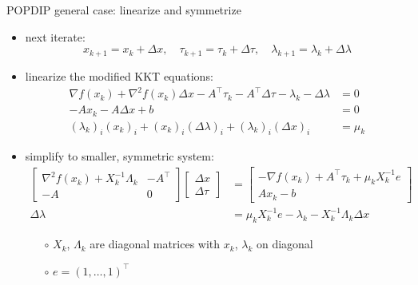 \documentclass[10pt,hyperref,dvipsnames]{beamer}
\newcommand{\grad}{\nabla}
\begin{document}
\begin{frame}{POPDIP general case: linearize and symmetrize}

\begin{itemize}
\item next iterate:
    $$x_{k+1} = x_k + \Delta x, \quad \tau_{k+1} = \tau_k + \Delta \tau, \quad \lambda_{k+1} = \lambda_k + \Delta \lambda$$
\item linearize the modified KKT equations:
\begin{align*}
\grad f(x_k) + \grad^2 f(x_k) \Delta x - A^\top \tau_k - A^\top \Delta \tau - \lambda_k - \Delta \lambda &= 0 \\
-A x_k - A \Delta x + b &= 0 \\
(\lambda_k)_i (x_k)_i + (x_k)_i (\Delta\lambda)_i + (\lambda_k)_i (\Delta x)_i &= \mu_k
\end{align*}
\item simplify to smaller, symmetric system:
\begin{align*}
\begin{bmatrix}
\grad^2 f(x_k) + X_k^{-1}\Lambda_k & -A^\top \\
-A             & 0
\end{bmatrix}
\begin{bmatrix}
\Delta x \\
\Delta \tau
\end{bmatrix}
&=
\begin{bmatrix}
-\grad f(x_k) + A^\top \tau_k + \mu_k X_k^{-1} e \\
A x_k - b
\end{bmatrix} \\
\Delta\lambda &= \mu_k X_k^{-1} e - \lambda_k - X_k^{-1} \Lambda_k \Delta x
\end{align*}

    \begin{itemize}
    \item[$\circ$] $X_k$, $\Lambda_k$ are diagonal matrices with $x_k$, $\lambda_k$ on diagonal
    \item[$\circ$] $e=(1,\dots,1)^\top$
    \end{itemize}
\end{itemize}
\end{frame}
\end{document}
